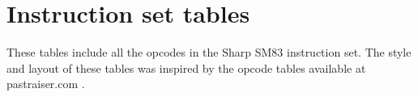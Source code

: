 \documentclass[\main/gbctr.tex]{subfiles}
\begin{document}
\chapter{Instruction set tables}

These tables include all the opcodes in the Sharp SM83 instruction set. The
style and layout of these tables was inspired by the opcode tables available at
pastraiser.com \cite{pastraiser}.

\begin{landscape}

\newcommand{\oplb}{\cellcolor{SkyBlue}}
\newcommand{\oplw}{\cellcolor{PaleGreen}}
\newcommand{\opab}{\cellcolor{Gold}}
\newcommand{\opaw}{\cellcolor{Pink}}
\newcommand{\opbi}{\cellcolor{Turquoise}}
\newcommand{\opcf}{\cellcolor{SandyBrown}}
\newcommand{\opmi}{\cellcolor{PaleVioletRed}}
\newcommand{\opun}{\cellcolor{Silver}}


\end{landscape}
\end{document}

